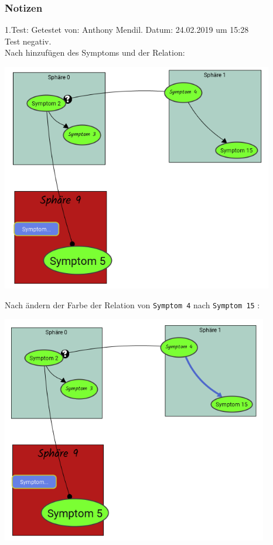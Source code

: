 \documentclass{scrartcl}
\begin{document}
\subsubsection{Notizen}
1.Test: Getestet von: Anthony Mendil. Datum: 24.02.2019 um 15:28 \\
Test negativ. \\
Nach hinzufügen des Symptoms und der Relation: 
\begin{center}
\includegraphics[height=10cm]{3_33vorher.PNG}
\end{center}
Nach ändern der Farbe der Relation von \texttt{Symptom 4} nach \texttt{Symptom 15} :
\begin{center}
\includegraphics[height=10cm]{3_33.PNG}
\end{center}
\end{document}
